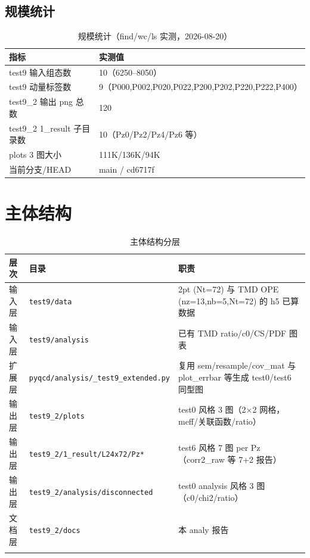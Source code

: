 \documentclass[UTF8]{ctexart}
\begin{document}
\subsection{规模统计}
\begin{table}[htbp]\centering
\begin{tabular}{ll}
\toprule
指标 & 实测值 \\
\midrule
test9 输入组态数 & 10（6250–8050） \\
test9 动量标签数 & 9（P000,P002,P020,P022,P200,P202,P220,P222,P400） \\
test9\_2 输出 png 总数 & 120 \\
test9\_2 1\_result 子目录数 & 10（Pz0/Pz2/Pz4/Pz6 等） \\
plots 3 图大小 & 111K/136K/94K \\
当前分支/HEAD & main / cd6717f \\
\bottomrule
\end{tabular}
\caption{规模统计（find/wc/ls 实测，2026-08-20）}
\end{table}

\section{主体结构}
\begin{xltabular}{\textwidth}{llX}
\toprule
\textcolor{struct}{层次} & 目录 & \textcolor{struct}{职责} \\
\midrule
\endhead
输入层 & \texttt{\nolinkurl{test9/data}} & 2pt (Nt=72) 与 TMD OPE (nz=13,nb=5,Nt=72) 的 h5 已算数据 \\
输入层 & \texttt{\nolinkurl{test9/analysis}} & 已有 TMD ratio/c0/CS/PDF 图表 \\
扩展层 & \texttt{pyqcd/analysis/\_test9\_extended.py} & 复用 sem/resample/cov\_mat 与 plot\_errbar 等生成 test0/test6 同型图 \\
输出层 & \texttt{test9\_2/plots} & test0 风格 3 图（2×2 网格，meff/关联函数/ratio） \\
输出层 & \texttt{test9\_2/1\_result/L24x72/Pz*} & test6 风格 7 图 per Pz（corr2\_raw 等 7+2 报告） \\
输出层 & \texttt{test9\_2/analysis/disconnected} & test0 analysis 风格 3 图（c0/chi2/ratio） \\
文档层 & \texttt{test9\_2/docs} & 本 analy 报告 \\
\bottomrule
\caption{主体结构分层}
\end{xltabular}

\end{document}
